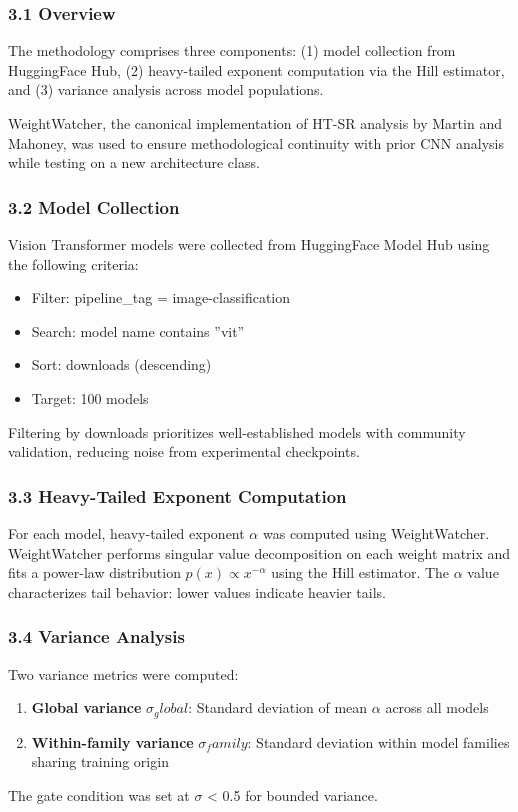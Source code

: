 
\subsubsection{3.1 Overview}

The methodology comprises three components: (1) model collection from HuggingFace Hub, (2) heavy-tailed exponent computation via the Hill estimator, and (3) variance analysis across model populations.

WeightWatcher, the canonical implementation of HT-SR analysis by Martin and Mahoney, was used to ensure methodological continuity with prior CNN analysis while testing on a new architecture class.

\subsubsection{3.2 Model Collection}

Vision Transformer models were collected from HuggingFace Model Hub using the following criteria:

\begin{itemize}
\item Filter: pipeline\_tag = image-classification
\item Search: model name contains ''vit''
\item Sort: downloads (descending)
\item Target: 100 models
\end{itemize}

Filtering by downloads prioritizes well-established models with community validation, reducing noise from experimental checkpoints.

\subsubsection{3.3 Heavy-Tailed Exponent Computation}

For each model, heavy-tailed exponent $\alpha$ was computed using WeightWatcher. WeightWatcher performs singular value decomposition on each weight matrix and fits a power-law distribution $p(x) \propto x^{-\alpha}$ using the Hill estimator. The $\alpha$ value characterizes tail behavior: lower values indicate heavier tails.

\subsubsection{3.4 Variance Analysis}

Two variance metrics were computed:

\begin{enumerate}
\item \textbf{Global variance} $\sigma _global$: Standard deviation of mean $\alpha$ across all models
\item \textbf{Within-family variance} $\sigma _family$: Standard deviation within model families sharing training origin
\end{enumerate}

The gate condition was set at $\sigma$ < 0.5 for bounded variance.

